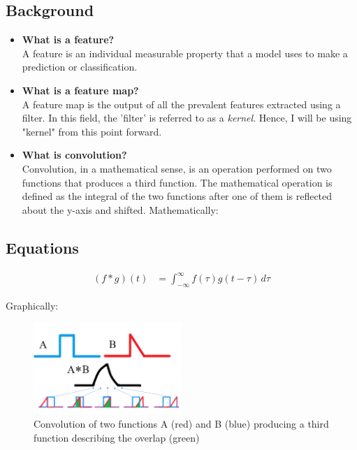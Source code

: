 \documentclass{article}
\begin{document}
\subsection{Background}
\begin{itemize}
  \item \textbf{What is a feature?} \\
    A feature is an individual measurable property that a model uses to make a prediction or classification.
  \item \textbf{What is a feature map?} \\
    A feature map is the output of all the prevalent features extracted using a filter. In this field, the 'filter' is referred to as a \emph{kernel}. Hence, I will be using "kernel" from this point forward.
  \item \textbf{What is convolution?} \\
    Convolution, in a mathematical sense, is an operation performed on two functions that produces a third function. The mathematical operation is defined as the integral of the two functions after one of them is reflected about the y-axis and shifted. Mathematically:
\end{itemize}

\subsection{Equations}
\begin{align*}
  \left( f  * g \right) \left( t \right) &= \int_{-\infty}^{\infty} f \left( \tau \right) g \left( t - \tau \right) \, d\tau
\end{align*}

Graphically:
\begin{figure}[H]
  \begin{center}
    \includegraphics[width=0.5\textwidth]{figures/math_con}
  \end{center}
  \caption{Convolution of two functions A (red) and B (blue) producing a third function describing the overlap (green)}\label{fig:}
\end{figure}
\end{document}
